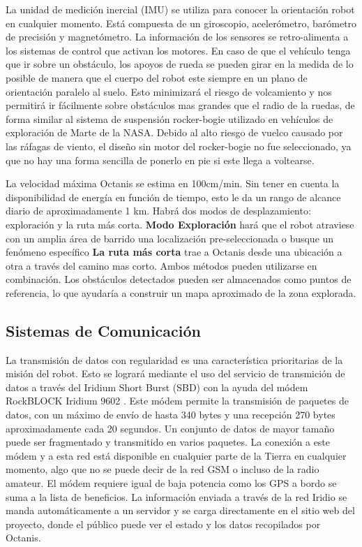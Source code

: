 \documentclass[a4paper,12pt]{article}
\begin{document}
La unidad de medición inercial (IMU) se utiliza para conocer la orientación robot en cualquier momento. Está compuesta de un giroscopio, acelerómetro, barómetro de precisión y magnetómetro. La información de los sensores se retro-alimenta a los sistemas de control que activan los motores. En caso de que el vehículo tenga que ir sobre un obstáculo, los apoyos de rueda se pueden girar en la medida de lo posible de manera que el cuerpo del robot este siempre en un plano de orientación paralelo al suelo. Esto minimizará el riesgo de volcamiento y nos permitirá ir fácilmente sobre obstáculos mas grandes que el radio de la ruedas, de forma similar al sistema de suspensión rocker-bogie utilizado en vehículos de exploración de Marte de la NASA\cite{rockerbogie}. Debido al alto riesgo de vuelco causado por las ráfagas de viento, el diseño sin motor del rocker-bogie no fue seleccionado, ya que no hay una forma sencilla de ponerlo en pie si este llega a voltearse.

La velocidad máxima Octanis se estima en 100cm/min. Sin tener en cuenta la disponibilidad de energía en función de tiempo, esto le da un rango de alcance diario de aproximadamente 1 km. Habrá dos modos de desplazamiento: exploración y la ruta más corta. \textbf{Modo Exploración} hará que el robot atraviese con un amplia área de barrido una localización pre-seleccionada o busque un fenómeno específico \textbf{La ruta más corta} trae a Octanis desde una ubicación a otra a través del camino mas corto. Ambos métodos pueden utilizarse en combinación. Los obstáculos detectados pueden ser almacenados como puntos de referencia, lo que ayudaría a construir un mapa aproximado de la zona explorada.

\subsection{Sistemas de Comunicación}
La transmisión de datos con regularidad es una característica prioritarias de la misión del robot. Esto se logrará mediante el uso del servicio de transmición de datos a través del Iridium Short Burst (SBD) con la ayuda del módem RockBLOCK Iridium 9602 \cite{iridium}. Este módem permite la transmisión de paquetes de datos, con un máximo de envío de hasta 340 bytes y una recepción 270 bytes aproximadamente cada 20 segundos. Un conjunto de datos de mayor tamaño puede ser fragmentado y transmitido en varios paquetes. La conexión a este módem y a esta red está disponible en cualquier parte de la Tierra en cualquier momento, algo que no se puede decir de la red GSM o incluso de la radio amateur. El módem requiere igual de baja potencia como los GPS a bordo se suma a la lista de beneficios. La información enviada a través de la red Iridio se manda automáticamente a un servidor y se carga directamente en el sitio web del proyecto, donde el público puede ver el estado y los datos recopilados por Octanis.
\end{document}
